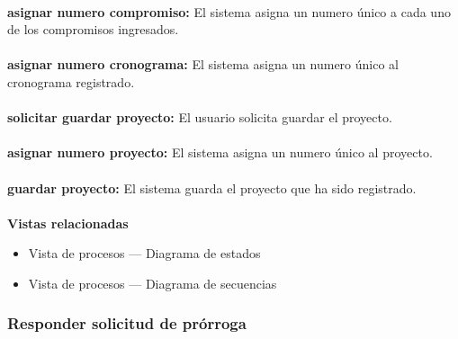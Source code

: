\documentclass[12pt,oneside,letterpaper]{report}
\begin{document}
\\
\textbf{asignar numero compromiso:} El sistema asigna un numero único a cada uno de los compromisos ingresados.\\
\\
\textbf{asignar numero cronograma:} El sistema asigna un numero único al cronograma registrado.\\
\\
\textbf{solicitar guardar proyecto:} El usuario solicita guardar el proyecto.\\
\\
\textbf{asignar numero proyecto:} El sistema asigna un numero único al proyecto.\\
\\
\textbf{guardar proyecto:} El sistema guarda el proyecto que ha sido registrado.\\
\\

\textbf{Vistas relacionadas}
\begin{itemize}
\item Vista de procesos --- Diagrama de estados
\item Vista de procesos --- Diagrama de secuencias
\end{itemize}

\subsubsection{Responder solicitud de prórroga}

\end{document}
